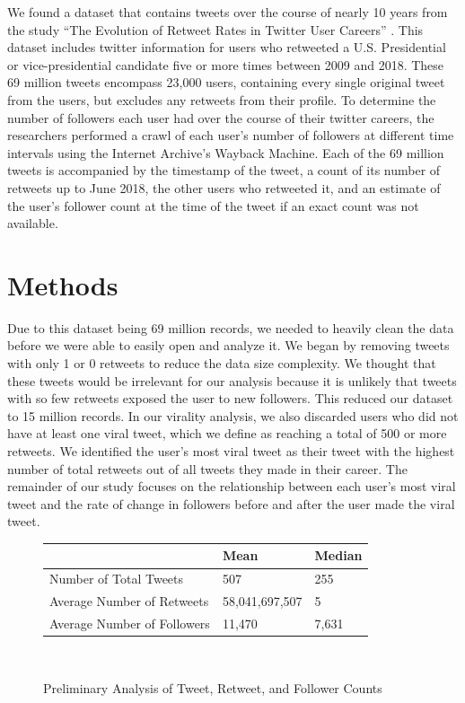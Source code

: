 \documentclass[twoside,twocolumn]{article}
\begin{document}
We found a dataset that contains tweets over the course of nearly 10 years from the study “The Evolution of Retweet Rates in Twitter User Careers” \cite{6}. This dataset includes twitter information for users who retweeted a U.S. Presidential or vice-presidential candidate five or more times between 2009 and 2018. These 69 million tweets encompass 23,000 users, containing every single original tweet from the users, but excludes any retweets from their profile. To determine the number of followers each user had over the course of their twitter careers, the researchers performed a crawl of each user’s number of followers at different time intervals using the Internet Archive’s Wayback Machine. Each of the 69 million tweets is accompanied by the timestamp of the tweet, a count of its number of retweets up to June 2018, the other users who retweeted it, and an estimate of the user’s follower count at the time of the tweet if an exact count was not available. 

\section{Methods}
Due to this dataset being 69 million records, we needed to heavily clean the data before we were able to easily open and analyze it. We began by removing tweets with only 1 or 0 retweets to reduce the data size complexity. We thought that these tweets would be irrelevant for our analysis because it is unlikely that tweets with so few retweets exposed the user to new followers. This reduced our dataset to 15 million records. In our virality analysis, we also discarded users who did not have at least one viral tweet, which we define as reaching a total of 500 or more retweets. We identified the user’s most viral tweet as their tweet with the highest number of total retweets out of all tweets they made in their career. The remainder of our study focuses on the relationship between each user’s most viral tweet and the rate of change in followers before and after the user made the viral tweet.

\begin{figure}[H]
\begin{tabular}{ | m{5em} | m{2cm}| m{1.5cm} | } 
  \hline
    & Mean & Median \\ 
  \hline
  Number of Total Tweets & 507 & 255 \\ 
  \hline
  Average Number of Retweets & 58,041,697,507 & 5 \\ 
  \hline
  Average Number of Followers & 11,470 & 7,631 \\ 
  \hline
\end{tabular}\\
\caption{Preliminary Analysis of Tweet, Retweet, and Follower Counts}
\end{figure}
\end{document}
